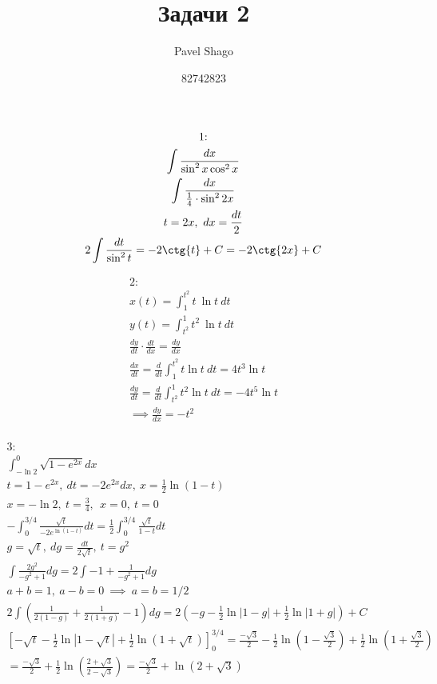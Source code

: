 \documentclass{report}
\title{\Huge{Задачи 2}}
\author{\huge{Pavel Shago}}
\date{82742823}
\begin{document}
\maketitle{}

\begin{multline}
    \text{1:}\\
    \int \frac{dx}{\sin^{2}{x} \cos^{2}{x}}\\
    \int \frac{dx}{\frac{1}{4} \cdot \sin^{2}{2x}}\\
    t = 2x,\ dx = \frac{dt}{2}\\
    2 \int \frac{dt}{\sin^{2}{t} } = -2\ctg{t} + C = -2\ctg{2x} + C\\
\end{multline}

\begin{multline}
    \text{2:}\\
    x(t) = \int_{1}^{t^{2}} t\ \ln{t}\ dt\\
    y(t) = \int_{t^{2}}^{1} t^{2}\ \ln{t}\ dt\\
    \frac{dy}{dt} \cdot \frac{dt}{dx} = \frac{dy}{dx}\\
    \frac{dx}{dt} = \frac{d}{dt} \int_{1}^{t^2} {t \ln{t}}\ dt = 4t^{3} \ln{t}\\
    \frac{dy}{dt} = \frac{d}{dt} \int_{t^2}^{1} {t^{2} \ln{t}}\ dt = -4t^{5} \ln{t}\\
    \implies \frac{dy}{dx} = -t^{2}\\
\end{multline}

\begin{multline}
    \text{3:}\\
    \int_{-\ln{2}}^{0} \sqrt{1 - e^{2x}} dx\\
    t = 1 - e^{2x},\ dt = -2e^{2x} dx,\ x = \frac{1}{2} \ln{(1-t)}\\
    x = -\ln{2},\ t = \frac{3}{4},\ \ x = 0,\ t = 0\\
    -\int_{0}^{3/4} \frac{\sqrt{t}}{-2e^{\ln{(1-t)}}} dt = \frac{1}{2} \int_{0}^{3/4} \frac{\sqrt{t}}{1 - t} dt\\
    g = \sqrt{t},\ dg = \frac{dt}{2\sqrt{t}},\ t = g^{2}\\
    \int \frac{2g^{2}}{-g^{2} + 1} dg = 2 \int -1 + \frac{1}{-g^{2} + 1} dg\\
    a + b = 1,\ a - b = 0\ \implies\ a = b = 1/2\\
    2 \int (\frac{1}{2(1 - g)} + \frac{1}{2(1 + g)} - 1) dg = 2(-g - \frac{1}{2} \ln{|1 - g|} + \frac{1}{2} \ln{|1 + g|}) + C\\
    [-\sqrt{t} - \frac{1}{2} \ln{|1 - \sqrt{t}|} + \frac{1}{2} \ln{(1 + \sqrt{t})}]_{0}^{3/4} = \frac{-\sqrt{3}}{2} - \frac{1}{2} \ln{(1 - \frac{\sqrt{3}}{2})} + \frac{1}{2} \ln{(1 + \frac{\sqrt{3}}{2})}\\
    = \frac{-\sqrt{3}}{2} + \frac{1}{2} \ln{(\frac{2 + \sqrt{3}}{2 - \sqrt{3}})} = \frac{-\sqrt{3}}{2} + \ln{(2 + \sqrt{3})}\\
\end{multline}
\end{document}
